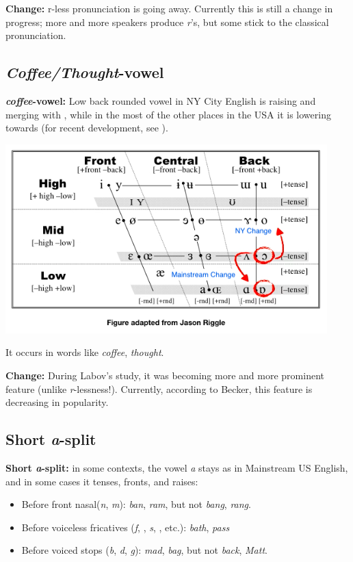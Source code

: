 \documentclass[11pt]{article}
\newcommand{\1}{$'$}
\newcommand{\2}{$''$}
\newcommand{\3}{$'''$}
\begin{document}
\noindent \textbf{Change:} r-less pronunciation is going away. Currently this is still a change in progress; more and more speakers produce \emph{r}'s, but some stick to the classical pronunciation.

\subsection{\emph{Coffee/Thought}-vowel}

\textbf{\emph{coffee}-vowel:} Low back rounded vowel \textipa{[0]} in NY City English is raising and merging with \textipa{[o]}, while in the most of the other places in the USA it is lowering towards \textipa{[6]} (for recent development, see \citealp{Becker:2014}).

\begin{center}
	\includegraphics[width=.7\textwidth]{coffee.png}	
\end{center}

	\noindent It occurs in words like \emph{coffee}, \emph{thought}.
	
\noindent \textbf{Change:} During Labov's study, it was becoming more and more prominent feature (unlike \emph{r}-lessness!). Currently, according to Becker, this feature is decreasing in popularity.

\subsection{Short \emph{a}-split}

\textbf{Short \emph{a}-split:} in some contexts, the vowel \emph{a} stays as in Mainstream US English, and in some cases it tenses, fronts, and raises:

	\begin{itemize}
		\item Before front nasal(\emph{n}, \emph{m}): \emph{ban}, \emph{ram}, but not \emph{bang}, \emph{rang}.
		\item Before voiceless fricatives (\emph{f}, \emph{}, \emph{s}, \emph{}, etc.): \emph{bath}, \emph{pass}
		\item Before voiced stops (\emph{b}, \emph{d}, \emph{g}): \emph{mad}, \emph{bag}, but not \emph{back}, \emph{Matt}.
	\end{itemize}
\end{document}

